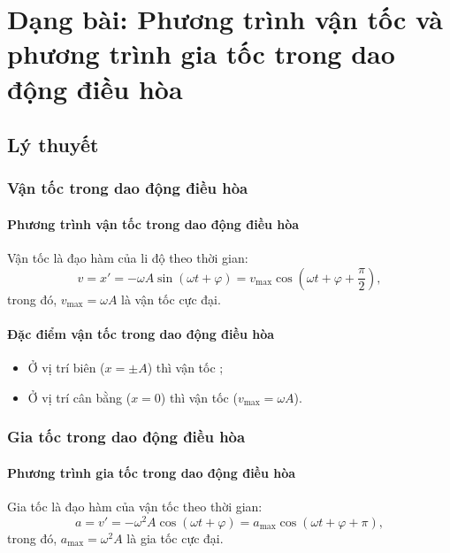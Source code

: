 
\chapter[Dạng bài: Phương trình vận tốc và phương trình gia tốc trong dao động điều hòa]{Dạng bài: Phương trình vận tốc và phương trình gia tốc trong dao động điều hòa}
\section{Lý thuyết}
\subsection{Vận tốc trong dao động điều hòa}
\subsubsection{Phương trình vận tốc trong dao động điều hòa}
Vận tốc là đạo hàm của li độ theo thời gian:
\begin{equation*} 
	v=x'=-\omega A \sin (\omega t +\varphi)=v_\text{max}\cos \left( \omega t+\varphi+\dfrac{\pi}{2}\right), 
\end{equation*}
trong đó, $v_\text{max}=\omega A$ là vận tốc cực đại.

\subsubsection{Đặc điểm vận tốc trong dao động điều hòa}
\begin{itemize}
	\item Ở vị trí biên ($x=\pm A$) thì vận tốc ;
	\item Ở vị trí cân bằng ($x=0$) thì vận tốc  ($v_{\text{max}} = \omega A$).
\end{itemize}
\subsection{Gia tốc trong dao động điều hòa}
\subsubsection{Phương trình gia tốc trong dao động điều hòa}
Gia tốc là đạo hàm của vận tốc theo thời gian:
\begin{equation*} 
	a=v'=-\omega^2 A \cos (\omega t +\varphi) =a_\text{max}\cos \left( \omega t+\varphi+\pi\right), 
\end{equation*}
trong đó, $a_\text{max}=\omega^2 A$ là gia tốc cực đại.

